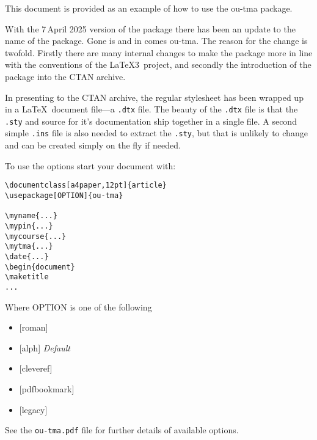 \documentclass[a4paper,12pt]{article}
\date{30 Sep, 2025} 	%
\begin{document}
\maketitle

\hfill{}

\begin{notebox}[width=\linewidth]

This document is provided as an example of how to use the \textsf{ou-tma} package.

With the 7\nth\,April 2025 version of the package there has been an update to the name of the package. Gone is  and in comes \textsf{ou-tma}. The reason for the change is twofold. Firstly there are many internal changes to make the package more in line with the conventions of the \LaTeX3\ project, and secondly the introduction of the package into the CTAN archive.

In presenting to the CTAN archive, the regular stylesheet has been wrapped up in a \LaTeX\ document file---a \verb|.dtx| file. The beauty of the \verb|.dtx| file is that the \verb|.sty| and source for it's documentation ship together in a single file. A second simple \verb|.ins| file is also needed to extract the \verb|.sty|, but that is unlikely to change and can be created simply on the fly if needed.

To use the options start your document with:
\begin{verbatim}
\documentclass[a4paper,12pt]{article}
\usepackage[OPTION]{ou-tma}

\myname{...}
\mypin{...}
\mycourse{...}
\mytma{...}
\date{...}
\begin{document}
\maketitle
...
\end{verbatim}

Where \textsf{OPTION} is one of the following
\begin{itemize}
  \item {[roman]}
  \item {[alph]} \emph{Default}
  \item {[cleveref]}
  \item {[pdfbookmark]}
  \item {[legacy]}
\end{itemize}

See the \verb|ou-tma.pdf| file for further details of available options.

\end{notebox}
\end{document}

